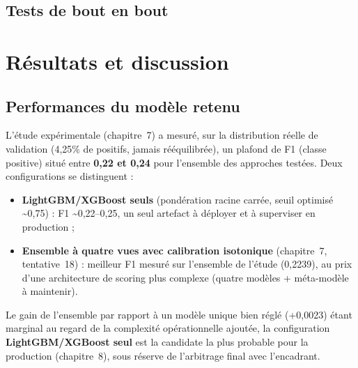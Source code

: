 \documentclass[11pt,a4paper]{report}
\begin{document}
\section{Tests de bout en bout}


\chapter{Résultats et discussion}

\section{Performances du modèle retenu}
L'étude expérimentale (chapitre~7) a mesuré, sur la distribution réelle de
validation (4,25\% de positifs, jamais rééquilibrée), un plafond de F1
(classe positive) situé entre \textbf{0,22 et 0,24} pour l'ensemble des
approches testées. Deux configurations se distinguent :
\begin{itemize}
  \item \textbf{LightGBM/XGBoost seuls} (pondération racine carrée, seuil
  optimisé \textasciitilde 0,75) : F1 \textasciitilde 0,22--0,25, un seul
  artefact à déployer et à superviser en production ;
  \item \textbf{Ensemble à quatre vues avec calibration isotonique}
  (chapitre~7, tentative~18) : meilleur F1 mesuré sur l'ensemble de
  l'étude (0,2239), au prix d'une architecture de scoring plus complexe
  (quatre modèles + méta-modèle à maintenir).
\end{itemize}
Le gain de l'ensemble par rapport à un modèle unique bien réglé
(+0,0023) étant marginal au regard de la complexité opérationnelle
ajoutée, la configuration \textbf{LightGBM/XGBoost seul} est la
candidate la plus probable pour la production (chapitre~8), sous réserve
de l'arbitrage final avec l'encadrant.
\end{document}
